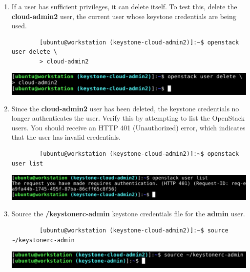 \documentclass[letterpaper, 12pt]{article}
\begin{document}
\begin{enumerate}
    \item If a user has sufficient privileges, it can delete itself.
    To test this, delete the \textbf{cloud-admin2} user, the current user whose keystone credentials are being used.
    \begin{lstlisting}
        [ubuntu@workstation (keystone-cloud-admin2)]:~$ openstack user delete \
        > cloud-admin2
    \end{lstlisting}

    \begin{center}
        \includegraphics[width=\linewidth]{images/appendix/step8.png}
    \end{center}

    \item Since the \textbf{cloud-admin2} user has been deleted, the keystone credentials no longer authenticates the user.
    Verify this by attempting to list the OpenStack users.
    You should receive an HTTP 401 (Unauthorized) error, which indicates that the user has invalid credentials.
    \begin{lstlisting}
        [ubuntu@workstation (keystone-cloud-admin2)]:~$ openstack user list
    \end{lstlisting}

    \begin{center}
        \includegraphics[width=\linewidth]{images/appendix/step9.png}
    \end{center}

    \item Source the \textbf{\texttildemid/keystonerc-admin} keystone credentials file for the \textbf{admin}
    user.
    \begin{lstlisting}
        [ubuntu@workstation (keystone-cloud-admin2)]:~$ source ~/keystonerc-admin
    \end{lstlisting}

    \begin{center}
        \includegraphics[width=\linewidth]{images/appendix/step10.png}
    \end{center}


\end{enumerate}
\end{document}
